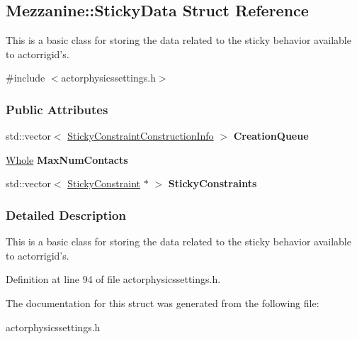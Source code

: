 \hypertarget{structMezzanine_1_1StickyData}{
\subsection{Mezzanine::StickyData Struct Reference}
\label{structMezzanine_1_1StickyData}
}


This is a basic class for storing the data related to the sticky behavior available to actorrigid's.  




{\ttfamily \#include $<$actorphysicssettings.h$>$}

\subsubsection*{Public Attributes}
\begin{DoxyCompactItemize}
\item 
\hypertarget{structMezzanine_1_1StickyData_aaed273a771f01553ee4ee8f6d36020d7}{
std::vector$<$ \hyperlink{structMezzanine_1_1StickyConstraintConstructionInfo}{StickyConstraintConstructionInfo} $>$ {\bfseries CreationQueue}}
\label{structMezzanine_1_1StickyData_aaed273a771f01553ee4ee8f6d36020d7}

\item 
\hypertarget{structMezzanine_1_1StickyData_a187bcd953ed41f4af50562255f633ba5}{
\hyperlink{namespaceMezzanine_adcbb6ce6d1eb4379d109e51171e2e493}{Whole} {\bfseries MaxNumContacts}}
\label{structMezzanine_1_1StickyData_a187bcd953ed41f4af50562255f633ba5}

\item 
\hypertarget{structMezzanine_1_1StickyData_aa1cb4315a53c06374f66d213558a2c56}{
std::vector$<$ \hyperlink{classMezzanine_1_1SliderConstraint}{StickyConstraint} $\ast$ $>$ {\bfseries StickyConstraints}}
\label{structMezzanine_1_1StickyData_aa1cb4315a53c06374f66d213558a2c56}

\end{DoxyCompactItemize}


\subsubsection{Detailed Description}
This is a basic class for storing the data related to the sticky behavior available to actorrigid's. 

Definition at line 94 of file actorphysicssettings.h.



The documentation for this struct was generated from the following file:\begin{DoxyCompactItemize}
\item 
actorphysicssettings.h\end{DoxyCompactItemize}
